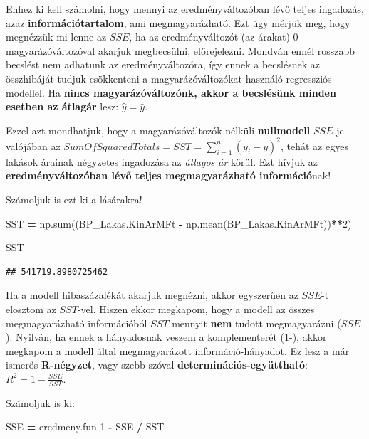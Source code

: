 \documentclass[
]{book}
\newenvironment{Shaded}{\begin{snugshade}}{\end{snugshade}}
\newcommand{\BuiltInTok}[1]{#1}
\newcommand{\DecValTok}[1]{\textcolor[rgb]{0.00,0.00,0.81}{#1}}
\newcommand{\NormalTok}[1]{#1}
\newcommand{\OperatorTok}[1]{\textcolor[rgb]{0.81,0.36,0.00}{\textbf{#1}}}
\begin{document}
Ehhez ki kell számolni, hogy mennyi az eredményváltozóban lévő teljes ingadozás, azaz \textbf{információtartalom}, ami megmagyarázható. Ezt úgy mérjük meg, hogy megnézzük mi lenne az \(SSE\), ha az eredményváltozót (az árakat) 0 magyarázóváltozóval akarjuk megbecsülni, előrejelezni. Mondván ennél rosszabb becslést nem adhatunk az eredményváltozóra, így ennek a becslésnek az összhibáját tudjuk csökkenteni a magyarázóváltozókat használó regressziós modellel. Ha \textbf{nincs magyarázóváltozónk, akkor a becslésünk minden esetben az átlagár} lesz: \(\hat{y}=\bar{y}\).

Ezzel azt mondhatjuk, hogy a magyarázóváltozók nélküli \textbf{nullmodell} \(SSE\)-je valójában az \(SumOfSquaredTotals=SST=\sum_{i=1}^n(y_i-\bar{y})^2\), tehát az egyes lakások árainak négyzetes ingadozása az \emph{átlagos ár} körül. Ezt hívjuk az \textbf{eredményváltozóban lévő teljes megmagyarázható információ}nak!

Számoljuk is ezt ki a lásárakra!

\begin{Shaded}
\begin{Highlighting}[]
\NormalTok{SST }\OperatorTok{=}\NormalTok{ np.}\BuiltInTok{sum}\NormalTok{((BP\_Lakas.KinArMFt }\OperatorTok{{-}}\NormalTok{ np.mean(BP\_Lakas.KinArMFt))}\OperatorTok{**}\DecValTok{2}\NormalTok{)}

\NormalTok{SST}
\end{Highlighting}
\end{Shaded}

\begin{verbatim}
## 541719.8980725462
\end{verbatim}

Ha a modell hibaszázalékát akarjuk megnézni, akkor egyszerűen az \(SSE\)-t elosztom az \(SST\)-vel. Hiszen ekkor megkapom, hogy a modell az összes megmagyarázható információból \(SST\) mennyit \textbf{nem} tudott megmagyarázni (\(SSE\)).
Nyilván, ha ennek a hányadosnak veszem a komplementerét (1-), akkor megkapom a modell által megmagyarázott információ-hányadot. Ez lesz a már ismerős \textbf{R-négyzet}, vagy szebb szóval \textbf{determinációs-együttható}: \(R^2=1-\frac{SSE}{SST}\).

Számoljuk is ki:

\begin{Shaded}
\begin{Highlighting}[]
\NormalTok{SSE }\OperatorTok{=}\NormalTok{ eredmeny.fun}
\DecValTok{1} \OperatorTok{{-}}\NormalTok{ SSE }\OperatorTok{/}\NormalTok{ SST}
\end{Highlighting}
\end{Shaded}
\end{document}
